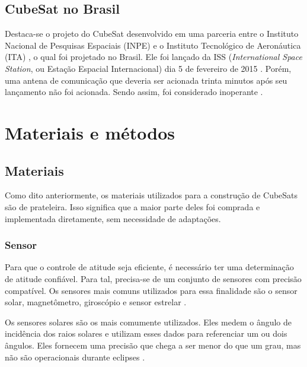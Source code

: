 \documentclass[
	12pt,				%
	openany,			%
	twoside,			%
	a4paper,			%
	english,			%
	french,				%
	spanish,			%
	brazil,				%
	oldfontcommands
	]{abntex2}
\begin{document}
\section[CubeSat no Brasil]{CubeSat no Brasil}

Destaca-se o projeto do CubeSat desenvolvido em uma parceria entre o Instituto Nacional de Pesquisas Espaciais (INPE) e o Instituto Tecnológico de Aeronáutica (ITA) \cite{AIT}, o qual foi projetado no Brasil. Ele foi lançado da ISS (\textit{International Space Station}, ou Estação Espacial Internacional) dia 5 de fevereiro de 2015 \cite{AEB}. Porém, uma antena de comunicação que deveria ser acionada trinta minutos após seu lançamento não foi acionada. Sendo assim, foi considerado inoperante \cite{ITA}.

\chapter[Materiais e Métodos]{Materiais e métodos}



\section[Materiais]{Materiais}

Como dito anteriormente, os materiais utilizados para a construção de CubeSats são de prateleira. Isso significa que a maior parte deles foi comprada e implementada diretamente, sem necessidade de adaptações.

\subsection{Sensor}

Para que o controle de atitude seja eficiente, é necessário ter uma determinação de atitude confiável. Para tal, precisa-se de um conjunto de sensores com precisão compatível. Os sensores mais comuns utilizados para essa finalidade são o sensor solar, magnetômetro, giroscópio e sensor estrelar \cite{FrancLav}.

Os sensores solares são os mais comumente utilizados. Eles medem o ângulo de incidência dos raios solares e utilizam esses dados para referenciar um ou dois ângulos. Eles fornecem uma precisão que chega a ser menor do que um grau, mas não são operacionais durante eclipses \cite{FrancLav}.
\end{document}
